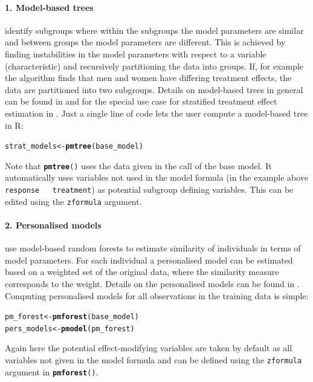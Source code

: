 \documentclass{josr}\usepackage[]{graphicx}\usepackage[]{color}
\makeatletter
\newcommand{\hlstd}[1]{\textcolor[rgb]{0.345,0.345,0.345}{#1}}%
\newcommand{\hlkwb}[1]{\textcolor[rgb]{0.69,0.353,0.396}{#1}}%
\newcommand{\hlkwd}[1]{\textcolor[rgb]{0.737,0.353,0.396}{\textbf{#1}}}%
\newenvironment{kframe}{%
 \def\at@end@of@kframe{}%
 \ifinner\ifhmode%
  \def\at@end@of@kframe{\end{minipage}}%
  \begin{minipage}{\columnwidth}%
 \fi\fi%
 \def\FrameCommand##1{\hskip\@totalleftmargin \hskip-\fboxsep
 \colorbox{shadecolor}{##1}\hskip-\fboxsep
     \hskip-\linewidth \hskip-\@totalleftmargin \hskip\columnwidth}%
 \MakeFramed {\advance\hsize-\width
   \@totalleftmargin\z@ \linewidth\hsize
   \@setminipage}}%
 {\par\unskip\endMakeFramed%
 \at@end@of@kframe}
\newenvironment{knitrout}{}{} %
\newcommand*{\textalltt}{}
\DeclareRobustCommand*{\textalltt}{%
  \begingroup
    \let\do\@makeother
    \dospecials
    \catcode`\\=\z@
    \catcode`\{=\@ne
    \catcode`\}=\tw@
    \verbatim@font\@noligs
    \@vobeyspaces
    \frenchspacing
    \@textalltt
}
\newcommand*{\@textalltt}[1]{%
    #1%
  \endgroup
}
\makeatother
\begin{document}
\paragraph{1. Model-based trees} identify subgroups where within the subgroups
the model parameters are similar and between groups the model parameters are
different. This is achieved by finding instabilities in the model parameters
with respect to a variable (characteristic) and recursively partitioning the
data into groups. If, for example the algorithm finds that men and women have
differing treatment effects, the data are partitioned into two subgroups.
Details on model-based trees in general can be found in
\citep{zeileis_model-based_2008} and for the special use case for stratified
treatment effect estimation in \citep{seibold_model-based_2016}.  Just a single
line of code lets the user compute a model-based tree in R:
\begin{knitrout}
\color{fgcolor}\begin{kframe}
\begin{alltt}
\hlstd{strat_models} \hlkwb{<-} \hlkwd{pmtree}\hlstd{(base_model)}
\end{alltt}
\end{kframe}
\end{knitrout}
Note that \texttt{\hlkwd{pmtree}\hlstd{()}} uses the data given in the call of the base model.
It automatically uses variables not used in the model formula (in the example
above \texttt{\hlstd{response} \textalltt{~} \hlstd{treatment}}) as potential subgroup defining variables.
This can be edited using the \texttt{\hlstd{zformula}} argument.

\paragraph{2. Personalised models} use model-based random forests to estimate
similarity of individuals in terms of model parameters. For each individual a
personalised model can be estimated based on a weighted set of the original
data, where the similarity measure corresponds to the weight. Details on the
personalised models can be found in \citep{seibold_individual_2017}.  Computing
personalised models for all observations in the training data is simple:
\begin{knitrout}
\color{fgcolor}\begin{kframe}
\begin{alltt}
\hlstd{pm_forest} \hlkwb{<-} \hlkwd{pmforest}\hlstd{(base_model)}
\hlstd{pers_models} \hlkwb{<-} \hlkwd{pmodel}\hlstd{(pm_forest)}
\end{alltt}
\end{kframe}
\end{knitrout}
Again here the potential effect-modifying variables are taken by default as all
variables not given in the model formula and can be defined using the
\texttt{\hlstd{zformula}} argument in \texttt{\hlkwd{pmforest}\hlstd{()}}.
\end{document}
